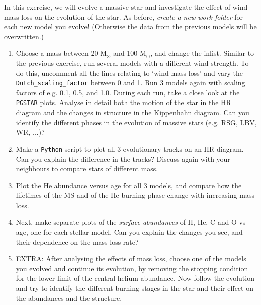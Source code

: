 \documentclass[11pt,a4paper]{article}
\begin{document}
In this exercise, we will evolve a massive star and investigate the effect of wind mass loss on the evolution of the star. As before, \emph{create a new work folder} for each new model you evolve! (Otherwise the data from the previous models will be overwritten.)
\begin{enumerate}
\item Choose a mass between 20 M$_\odot$ and 100 M$_\odot$, and change the inlist. Similar to the previous exercise, run several models with a different wind strength. To do this, uncomment all the lines relating to `wind mass loss' and vary the \verb|Dutch_scaling_factor| between 0 and 1. Run 3 models again with scaling factors of e.g. 0.1, 0.5, and 1.0. During each run, take a close look at the \texttt{PGSTAR} plots. Analyse in detail both the motion of the star in the HR diagram and the changes in structure in the Kippenhahn diagram. Can you identify the different phases in the evolution of massive stars (e.g. RSG, LBV, WR, ...)? %
\item Make a \texttt{Python} script to plot all 3 evolutionary tracks on an HR diagram. Can you explain the difference in the tracks? Discuss again with your neighbours to compare stars of different mass.
\item Plot the He abundance versus age for all 3 models, and compare how the lifetimes of the MS and of the He-burning phase change with increasing mass loss.
\item Next, make separate plots of the \emph{surface abundances} of H, He, C and O vs age, one for each stellar model. Can you explain the changes you see, and their dependence on the mass-loss rate?

\item EXTRA: After analysing the effects of mass loss, choose one of the models you evolved and continue its evolution, by removing the stopping condition for the lower limit of the central helium abundance. 
Now follow the evolution and try to identify the different burning stages in the star and their effect on the abundances and the structure. 
\end{enumerate}



\end{document}
